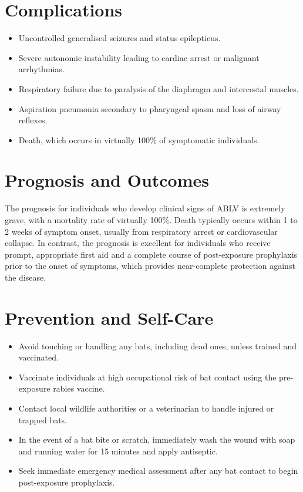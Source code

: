 \section*{Complications}
\begin{itemize}
    \item Uncontrolled generalised seizures and status epilepticus.
    \item Severe autonomic instability leading to cardiac arrest or malignant arrhythmias.
    \item Respiratory failure due to paralysis of the diaphragm and intercostal muscles.
    \item Aspiration pneumonia secondary to pharyngeal spasm and loss of airway reflexes.
    \item Death, which occurs in virtually 100\% of symptomatic individuals.
\end{itemize}

\section*{Prognosis and Outcomes}
The prognosis for individuals who develop clinical signs of ABLV is extremely grave, with a mortality rate of virtually 100\%. Death typically occurs within 1 to 2 weeks of symptom onset, usually from respiratory arrest or cardiovascular collapse. In contrast, the prognosis is excellent for individuals who receive prompt, appropriate first aid and a complete course of post-exposure prophylaxis prior to the onset of symptoms, which provides near-complete protection against the disease.

\section*{Prevention and Self-Care}
\begin{itemize}
    \item Avoid touching or handling any bats, including dead ones, unless trained and vaccinated.
    \item Vaccinate individuals at high occupational risk of bat contact using the pre-exposure rabies vaccine.
    \item Contact local wildlife authorities or a veterinarian to handle injured or trapped bats.
    \item In the event of a bat bite or scratch, immediately wash the wound with soap and running water for 15 minutes and apply antiseptic.
    \item Seek immediate emergency medical assessment after any bat contact to begin post-exposure prophylaxis.
\end{itemize}

